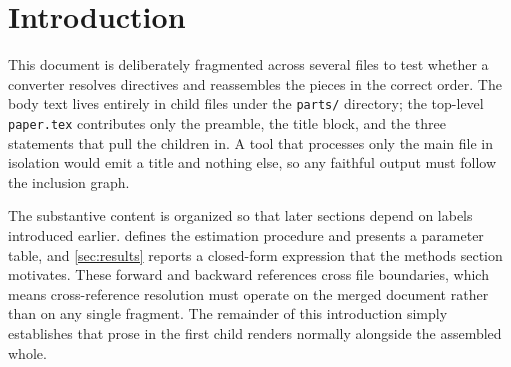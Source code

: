\section{Introduction}
\label{sec:intro}

This document is deliberately fragmented across several files to test whether a
converter resolves \verb|| directives and reassembles the pieces in the
correct order. The body text lives entirely in child files under the
\texttt{parts/} directory; the top-level \texttt{paper.tex} contributes only the
preamble, the title block, and the three \verb|| statements that pull the
children in. A tool that processes only the main file in isolation would emit a
title and nothing else, so any faithful output must follow the inclusion graph.

The substantive content is organized so that later sections depend on labels
introduced earlier.  defines the estimation procedure and
presents a parameter table, and \cref{sec:results} reports a closed-form
expression that the methods section motivates. These forward and backward
references cross file boundaries, which means cross-reference resolution must
operate on the merged document rather than on any single fragment. The remainder
of this introduction simply establishes that prose in the first child renders
normally alongside the assembled whole.
